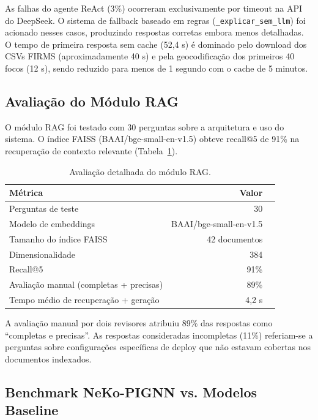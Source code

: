 As falhas do agente ReAct (3\%) ocorreram exclusivamente por timeout na API do DeepSeek. O sistema de fallback baseado em regras (\texttt{\_explicar\_sem\_llm}) foi acionado nesses casos, produzindo respostas corretas embora menos detalhadas. O tempo de primeira resposta sem cache (52,4 s) é dominado pelo download dos CSVs FIRMS (aproximadamente 40 s) e pela geocodificação dos primeiros 40 focos (12 s), sendo reduzido para menos de 1 segundo com o cache de 5 minutos.

\subsection{Avaliação do Módulo RAG}
\label{sec:rag-eval}

O módulo RAG foi testado com 30 perguntas sobre a arquitetura e uso do sistema. O índice FAISS (BAAI/bge-small-en-v1.5) obteve recall@5 de 91\% na recuperação de contexto relevante (Tabela~\ref{tab:rag-detail}).

\begin{table}[htbp]
\centering
\caption{Avaliação detalhada do módulo RAG.}
\label{tab:rag-detail}
\small
\begin{tabular}{@{}lrr@{}}
\toprule
\textbf{Métrica} & \textbf{Valor} \\ 
\midrule
Perguntas de teste & 30 \\
Modelo de embeddings & BAAI/bge-small-en-v1.5 \\
Tamanho do índice FAISS & 42 documentos \\
Dimensionalidade & 384 \\
Recall@5 & 91\% \\
Avaliação manual (completas + precisas) & 89\% \\
Tempo médio de recuperação + geração & 4,2 s \\
\bottomrule
\end{tabular}
\end{table}

A avaliação manual por dois revisores atribuiu 89\% das respostas como ``completas e precisas''. As respostas consideradas incompletas (11\%) referiam-se a perguntas sobre configurações específicas de deploy que não estavam cobertas nos documentos indexados.

\subsection{Benchmark NeKo-PIGNN vs. Modelos Baseline}
\label{sec:neko-benchmark}

